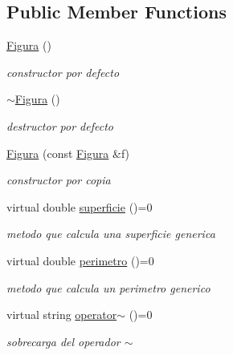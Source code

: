 \subsection*{Public Member Functions}
\begin{DoxyCompactItemize}
\item 
\mbox{\label{class_figura_a6977c7f0438c11b985a9a74c208b51c8}} 
\hyperlink{class_figura_a6977c7f0438c11b985a9a74c208b51c8}{Figura} ()
\begin{DoxyCompactList}\small\item\em constructor por defecto \end{DoxyCompactList}\item 
\mbox{\label{class_figura_a6130eb548893c36efcb7933e2da6821e}} 
\hyperlink{class_figura_a6130eb548893c36efcb7933e2da6821e}{$\sim$\+Figura} ()
\begin{DoxyCompactList}\small\item\em destructor por defecto \end{DoxyCompactList}\item 
\mbox{\label{class_figura_a2f55faa2fd40a5ebb2c5d1c958927f2a}} 
\hyperlink{class_figura_a2f55faa2fd40a5ebb2c5d1c958927f2a}{Figura} (const \hyperlink{class_figura}{Figura} \&f)
\begin{DoxyCompactList}\small\item\em constructor por copia \end{DoxyCompactList}\item 
\mbox{\label{class_figura_aaaff1d3f33df845278d20b5eab009fca}} 
virtual double \hyperlink{class_figura_aaaff1d3f33df845278d20b5eab009fca}{superficie} ()=0
\begin{DoxyCompactList}\small\item\em metodo que calcula una superficie generica \end{DoxyCompactList}\item 
\mbox{\label{class_figura_ad41d892aad534c23be85b96671c09d78}} 
virtual double \hyperlink{class_figura_ad41d892aad534c23be85b96671c09d78}{perimetro} ()=0
\begin{DoxyCompactList}\small\item\em metodo que calcula un perimetro generico \end{DoxyCompactList}\item 
\mbox{\label{class_figura_a56c66abd270dbf126bfb2e8d69b646f6}} 
virtual string \hyperlink{class_figura_a56c66abd270dbf126bfb2e8d69b646f6}{operator$\sim$} ()=0
\begin{DoxyCompactList}\small\item\em sobrecarga del operador $\sim$ \end{DoxyCompactList}\end{DoxyCompactItemize}
